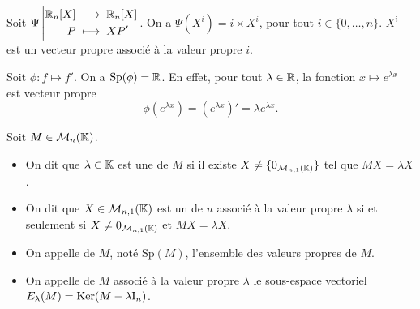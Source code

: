 \documentclass[a4paper]{book}
\begin{document}
\begin{Exemple} Soit ${\Psi}\left|\begin{aligned}{\mathbb {R}_n[X] }&\;\longrightarrow\;{\mathbb {R}_n[X]}\\{P}&\;\longmapsto\;{XP'}\end{aligned}\right.$. On a $\Psi(X^i)=i\times  X^i$, pour tout $i\in\{0,\dots,n\}$. $X^i$ est un vecteur propre associé à la valeur propre $i$.
\end{Exemple}
\begin{Exemple} Soit $\phi:f\mapsto f'.$ On a $\mathrm{Sp}(\phi)=\mathbb{R}$. En effet, pour tout $\lambda\in\mathbb{R}$, la fonction $x\mapsto e^{\lambda x}$ est vecteur propre $$\phi(e^{\lambda x})=(e^{\lambda x})'=\lambda e^{\lambda x}.$$
\end{Exemple}
\begin{Definition}
Soit $M\in \mathcal{M}_{n}(\mathbb{K})$.
\begin{itemize}
\item On dit que $\lambda    \in \mathbb{K} $ est une  de $M$ si  il existe $X\neq \{0_{\mathcal{M}_{n,1}(\mathbb{K})}\}$ tel que $MX =\lambda    X$.
\item On dit que $X\in\mathcal{M}_{n,1}(\mathbb{K})$ est un  de $u$ associé à la valeur propre $\lambda    $ si et seulement si $X\neq 0_{\mathcal{M}_{n,1}(\mathbb{K})}$ et $MX =\lambda    X$.
\item On appelle  de $M$, noté $\mathrm{Sp}(M)$, l'ensemble des valeurs propres de $M$.
\item On appelle  de $M$ associé à la valeur propre $\lambda    $ le sous-espace vectoriel $E_\lambda    (M) = \operatorname{Ker}(M -\lambda    \mathrm{I}_n)$.
\end{itemize}
\end{Definition}
\end{document}
